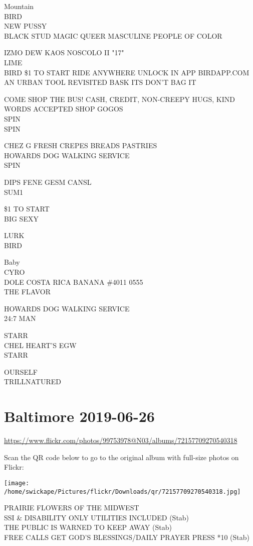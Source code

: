 \documentclass[10pt,letterpaper]{article}
\begin{document}
Mountain\\
BIRD\\
NEW PUSSY\\
BLACK STUD MAGIC QUEER MASCULINE PEOPLE OF COLOR

IZMO DEW KAOS NOSCOLO II "17"\\
LIME\\
BIRD \$1 TO START RIDE ANYWHERE UNLOCK IN APP BIRDAPP.COM\\
AN URBAN TOOL REVISITED BASK ITS DON'T BAG IT

COME SHOP THE BUS!  CASH, CREDIT, NON{-}CREEPY HUGS, KIND WORDS ACCEPTED SHOP GOGOS\\
SPIN\\
SPIN

CHEZ G FRESH CREPES BREADS PASTRIES\\
HOWARDS DOG WALKING SERVICE\\
SPIN

DIPS FENE GESM CANSL\\
SUM1

\$1 TO START\\
BIG SEXY

LURK\\
BIRD

Baby\\
CYRO\\
DOLE COSTA RICA BANANA \#4011 0555\\
THE FLAVOR

HOWARDS DOG WALKING SERVICE\\
24:7 MAN

STARR\\
CHEL HEART'S EGW\\
STARR

OURSELF\\
TRILLNATURED


\section*{Baltimore 2019-06-26}

\url{https://www.flickr.com/photos/99753978@N03/albums/72157709270540318}

Scan the QR code below to go to the original album with full-size photos on Flickr:

\texttt{[image: /home/swickape/Pictures/flickr/Downloads/qr/72157709270540318.jpg]}


PRAIRIE FLOWERS OF THE MIDWEST\\
SSI \& DISABILITY ONLY UTILITIES INCLUDED (Stab)\\
THE PUBLIC IS WARNED TO KEEP AWAY (Stab)\\
FREE CALLS GET GOD'S BLESSINGS/DAILY PRAYER PRESS *10 (Stab)
\end{document}
